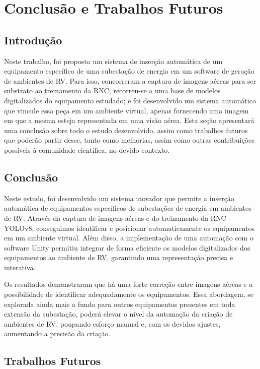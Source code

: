 \chapter{Conclusão e Trabalhos Futuros}

\section{Introdução} 

Neste trabalho, foi proposto um sistema de inserção automática de um equipamento específico de uma subestação de energia em um software de geração de ambientes de RV. Para isso, concorreram a captura de imagens aéreas para ser substrato ao treinamento da RNC; recorreu-se a uma base de modelos digitalizados do equipamento estudado; e foi desenvolvido um sistema automático que vincule essa peça em um ambiente virtual, apenas fornecendo uma imagem em que a mesma esteja representada em uma visão aérea. Esta seção apresentará uma conclusão sobre todo o estudo desenvolvido, assim como trabalhos futuros que poderão partir desse, tanto como melhorias, assim como outras contribuições possíveis à comunidade científica, no devido contexto.

\section{Conclusão} 

Neste estudo, foi desenvolvido um sistema inovador que permite a inserção automática de equipamentos específicos de subestações de energia em ambientes de RV. Através da captura de imagens aéreas e do treinamento da RNC YOLOv8, conseguimos identificar e posicionar automaticamente os equipamentos em um ambiente virtual. Além disso, a implementação de uma automação com o software Unity permitiu integrar de forma eficiente os modelos digitalizados dos equipamentos ao ambiente de RV, garantindo uma representação precisa e interativa.

Os resultados demonstraram que há uma forte correção entre imagens aéreas e a possibilidade de identificar adequadamente os equipamentos. Essa abordagem, se explorada ainda mais a fundo para outros equipamentos presentes em toda extensão da subestação, poderá elevar o nível da automação da criação de ambientes de RV, poupando esforço manual e, com os devidos ajustes, aumentando a precisão da criação.

\section{Trabalhos Futuros} 

